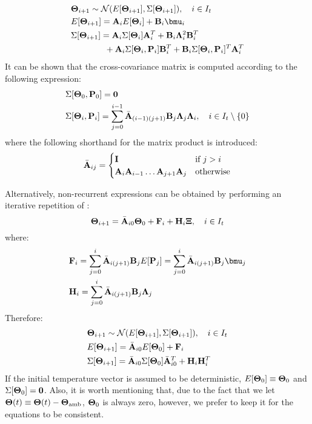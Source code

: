 \begin{align*}
  & \vtemperature_{i + 1} \sim \normal(\expectation{\vtemperature_{i + 1}}, \covariance{\vtemperature_{i + 1}}), \sep i \in \timeindex \\
  & \expectation{\vtemperature_{i + 1}} = \m{A}_i \expectation{\vtemperature_i} + \m{B}_i \vmean{i} \\
  & \covariance{\vtemperature_{i + 1}} = \m{A}_i \covariance{\vtemperature_i} \m{A}_i^T + \m{B}_i \ddeviation{i}^2 \m{B}_i^T \\
  & {} \qquad \qquad + \m{A}_i \covariance{\vtemperature_i, \vpower_i} \m{B}_i^T + \m{B}_i \covariance{\vtemperature_i, \vpower_i}^T \m{A}_i^T
\end{align*}
It can be shown that the cross-covariance matrix is computed according to the following expression:
\begin{align}
  & \covariance{\vtemperature_0, \vpower_0} = \mzero \nonumber \\
  & \covariance{\vtemperature_i, \vpower_i} = \sum_{j = 0}^{i - 1} \am{A}_{(i - 1)(j + 1)} \m{B}_j \ddeviation{j} \ddeviation{i}, \sep i \in \timeindex \setminus \{0\}  \equlabel{cross-covariance}
\end{align}
where the following shorthand for the matrix product is introduced:
\[
  \Bar{\mathbf{A}}_{ij} = \begin{cases}
    \mathbf{I} & \mbox{if } j > i \\
    \mathbf{A}_i \mathbf{A}_{i - 1} \dots \mathbf{A}_{j + 1} \mathbf{A}_j & \mbox{otherwise}
  \end{cases}
\]

Alternatively, non-recurrent expressions can be obtained by performing an iterative repetition of :
\begin{equation} \equlabel{tta-fourier-process-variation-non-recurrent}
  \vtemperature_{i + 1} = \am{A}_{i0} \vtemperature_0 + \v{F}_i + \v{H}_i \vstdnormal, \sep i \in \timeindex
\end{equation}
where:
\begin{align}
  & \v{F}_i = \sum_{j = 0}^{i} \am{A}_{i(j+1)} \m{B}_j \expectation{\vpower_j} = \sum_{j = 0}^{i} \am{A}_{i(j+1)} \m{B}_j \vmean{j} \equlabel{f} \\
  & \v{H}_i = \sum_{j = 0}^{i} \am{A}_{i(j+1)} \m{B}_j \ddeviation{j} \equlabel{h}
\end{align}
Therefore:
\begin{align*}
  & \mathbf{\Theta}_{i + 1} \sim \mathcal{N}(E[\mathbf{\Theta}_{i + 1}], \Sigma[\mathbf{\Theta}_{i + 1}]), \hspace{10pt} i \in I_t \\
  & E[\mathbf{\Theta}_{i + 1}] = \Bar{\mathbf{A}}_{i0} E[\mathbf{\Theta}_0] + \mathbf{F}_i \\
  & \Sigma[\mathbf{\Theta}_{i + 1}] = \Bar{\mathbf{A}}_{i0} \Sigma[\mathbf{\Theta}_0] \Bar{\mathbf{A}}_{i0}^T + \mathbf{H}_i \mathbf{H}_i^T
\end{align*}
If the initial temperature vector is assumed to be deterministic, $E[\mathbf{\Theta}_0] \equiv \mathbf{\Theta}_0$ and $\Sigma[\mathbf{\Theta}_0] = \mathbf{0}$. Also, it is worth mentioning that, due to the fact that we let $\mathbf{\Theta}(t) \equiv \mathbf{\Theta}(t) - \mathbf{\Theta}_{\text{amb}}$, $\mathbf{\Theta}_0$ is always zero, however, we prefer to keep it for the equations to be consistent.
